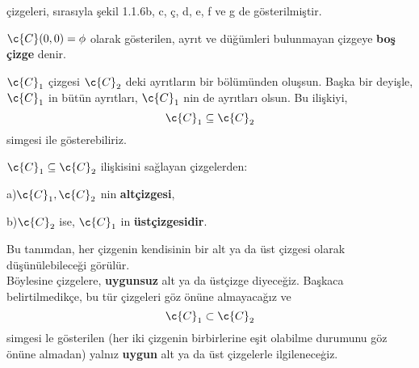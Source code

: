 \documentclass[11pt]{amsbook}
\begin{document}


\c{c}izgeleri, s{\i}ras{\i}yla \c{s}ekil 1.1.6b, c, \c{c}, d, e, f ve g de g\"{o}sterilmi\c{s}tir.\\
\begin{definition}
$\c{C}(0, 0) = \phi$ olarak g\"{o}sterilen, ayr{\i}t ve d\"{u}\u{g}\"{u}mleri bulunmayan \c{c}izgeye \textbf{bo\c{s} \c{c}izge} denir. 
\end{definition}


$\c{C}_1$ \c{c}izgesi $\c{C}_2$ deki ayr{\i}tlar{\i}n bir b\"{o}l\"{u}m\"{u}nden olu\c{s}sun. Ba\c{s}ka bir deyi\c{s}le, $\c{C}_1$ in b\"{u}t\"{u}n ayr{\i}tlar{\i}, $\c{C}_1$ nin de ayr{\i}tlar{\i} olsun. Bu ili\c{s}kiyi,
\begin{equation}
\c{C}_1 \subseteq \c{C}_2 
\end{equation}
simgesi ile g\"{o}sterebiliriz.\\

\begin{definition}
$\c{C}_1 \subseteq \c{C}_2$  ili\c{s}kisini sa\u{g}layan \c{c}izgelerden:\\
\begin{item}
a)$\c{C}_1, \c{C}_2$ nin \textbf{alt\c{c}izgesi},
\end{item}
\begin{item}
b)$\c{C}_2$ ise, $\c{C}_1$ in \textbf{\"{u}st\c{c}izgesidir}.
\end{item}
\end{definition}
	Bu tan{\i}mdan, her \c{c}izgenin kendisinin bir alt ya da \"{u}st \c{c}izgesi olarak d\"{u}\c{s}\"{u}n\"{u}lebilece\u{g}i g\"{o}r\"{u}l\"{u}r. \\
B\"{o}ylesine \c{c}izgelere, \textbf{uygunsuz} alt ya da \"{u}st\c{c}izge diyece\u{g}iz. Ba\c{s}kaca belirtilmedik\c{c}e, bu t\"{u}r \c{c}izgeleri g\"{o}z \"{o}n\"{u}ne almayaca\u{g}{\i}z ve
\begin{equation}
\c{C}_1 \subset \c{C}_2 
\end{equation}
simgesi le g\"{o}sterilen (her iki \c{c}izgenin birbirlerine e\c{s}it olabilme durumunu g\"{o}z \"{o}n\"{u}ne almadan) yaln{\i}z \textbf{uygun} alt ya da \"{u}st \c{c}izgelerle ilgilenece\c{g}iz.
 
\end{document}
